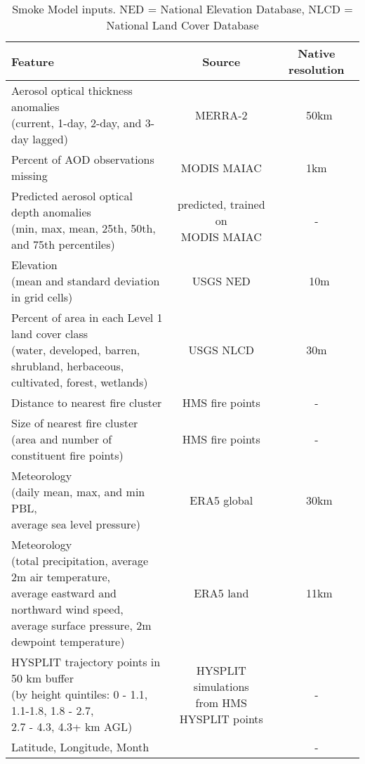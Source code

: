 \begin{table}[H]
    \centering
    \caption{Smoke \pmt Model inputs. NED = National Elevation Database, NLCD = National Land Cover Database}
    \begin{tabular}{l|c|c}
        Feature & Source & Native resolution\\
        \hline
        \hline
        \shortstack[l]{Aerosol optical thickness anomalies\\ (current, 1-day, 2-day, and 3-day lagged)}& MERRA-2 & ~50km\\
        \hline 
        Percent of AOD observations missing & MODIS MAIAC & 1km \\
        \hline
        \shortstack[l]{Predicted aerosol optical depth anomalies \\ (min, max, mean, 25th, 50th, and 75th percentiles)} & \shortstack[l]{predicted, trained on \\ MODIS MAIAC} & - \\
        \hline 
        \shortstack[l]{Elevation \\ (mean and standard deviation in grid cells)} & USGS NED & ~10m \\
        \hline
        \shortstack[l]{Percent of area in each Level 1 land cover class \\ (water, developed, barren, shrubland, herbaceous,\\cultivated, forest, wetlands)} & USGS NLCD & 30m \\
        \hline 
        Distance to nearest fire cluster & HMS fire points & - \\
        \hline 
        \shortstack[l]{Size of nearest fire cluster \\ (area and number of constituent fire points)} & HMS fire points & -\\
        \hline 
        \shortstack[l]{Meteorology \\ (daily mean, max, and min PBL,\\average sea level pressure)} & ERA5 global & ~30km \\
        \hline
        \shortstack[l]{Meteorology \\ (total precipitation, average 2m air temperature,\\ average eastward and northward wind speed,\\ average surface pressure, 2m dewpoint temperature)} & ERA5 land & ~11km \\
        \hline 
        \shortstack[l]{HYSPLIT trajectory points in 50 km buffer \\ (by height quintiles: 0 - 1.1, 1.1-1.8, 1.8 - 2.7,\\2.7 - 4.3, 4.3+ km AGL)} & \shortstack[l]{HYSPLIT simulations\\from HMS HYSPLIT points} & - \\ 
        \hline
        Latitude, Longitude, Month & & - \\
    \end{tabular}
    \label{tab:inputs}
\end{table}
